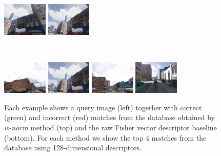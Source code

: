 \begin{figure}[t!]
\begin{minipage}{0.75\linewidth}
\begin{minipage}{\linewidth}
                \colorbox{myGreen}{\includegraphics[height=16mm]{imgs/ex4/FVsvm5.jpg}}
                \colorbox{myGreen}{\includegraphics[height=16mm]{imgs/ex4/FVsvm4.jpg}}
            \end{minipage}
            \\
            \begin{minipage}{\linewidth}
                \colorbox{myRed}{\includegraphics[height=16mm]{imgs/ex4/FV1.jpg}}
                \colorbox{myGreen}{\includegraphics[height=16mm]{imgs/ex4/FV2.jpg}}
                \colorbox{myRed}{\includegraphics[height=16mm]{imgs/ex4/FV3.jpg}}
                \colorbox{myRed}{\includegraphics[height=16mm]{imgs/ex4/FV4.jpg}}
            \end{minipage} 
        \end{minipage}
        \caption{
            Each example shows a query image (left) together with correct (green) and incorrect (red) matches from the database obtained by \emph{w-norm} method (top) and the raw Fisher vector descriptor baseline (bottom). For each method we show the top 4 matches from the database using 128-dimensional descriptors.        
        }
        \label{fig:images}
    \end{figure}